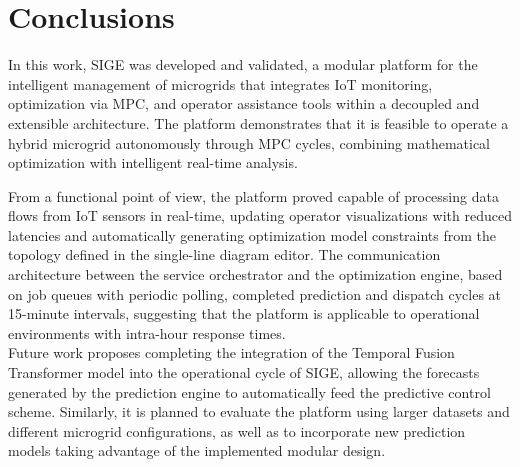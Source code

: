 \documentclass[journal,article,submit,pdftex,moreauthors]{Definitions/mdpi}
\begin{document}
\section{Conclusions}
In this work, SIGE was developed and validated, a modular platform for the intelligent management of microgrids that integrates IoT monitoring, optimization via MPC, and operator assistance tools within a decoupled and extensible architecture. The platform demonstrates that it is feasible to operate a hybrid microgrid autonomously through MPC cycles, combining mathematical optimization with intelligent real-time analysis.

From a functional point of view, the platform proved capable of processing data flows from IoT sensors in real-time, updating operator visualizations with reduced latencies and automatically generating optimization model constraints from the topology defined in the single-line diagram editor. The communication architecture between the service orchestrator and the optimization engine, based on job queues with periodic polling, completed prediction and dispatch cycles at 15-minute intervals, suggesting that the platform is applicable to operational environments with intra-hour response times.
\\

Future work proposes completing the integration of the Temporal Fusion Transformer model into the operational cycle of SIGE, allowing the forecasts generated by the prediction engine to automatically feed the predictive control scheme. Similarly, it is planned to evaluate the platform using larger datasets and different microgrid configurations, as well as to incorporate new prediction models taking advantage of the implemented modular design.


\vspace{6pt}
\end{document}

